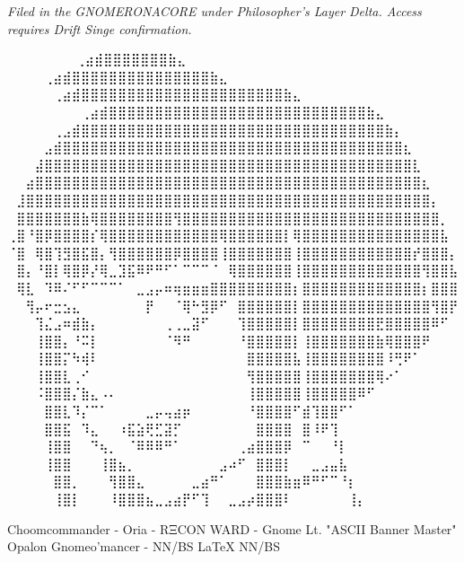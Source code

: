 \vspace{2em}
\begin{flushright}
\textit{Filed in the GNOMERONACORE under Philosopher’s Layer Delta. Access requires Drift Singe confirmation.}
\end{flushright}

\iffalse

  ⠀⠀⠀⠀⠀             ⠀⠀⢀⣴⣾⣿⣿⣿⣿⣿⣿⣿⣷⣄⠀⠀⠀⠀⠀⠀⠀⠀
⠀⠀⠀  ⠀      ⠀⠀⠀⠀⢀⣴⣾⣿⣿⣿⣿⣿⣿⣿⣿⣿⣿⣿⣿⣿⣿⣿⣷⣄⠀⠀⠀⠀⠀⠀⠀⠀
⠀⠀ ⠀   ⠀⠀⠀⠀⠀⢀⣴⣾⣿⣿⣿⣿⣿⣿⣿⣿⣿⣿⣿⣿⣿⣿⣿⣿⣿⣿⣿⣿⣿⣿⣷⣄⠀⠀⠀⠀⠀⠀⠀⠀
⠀⠀⠀⠀⠀⠀⠀⠀⢀⣴⣾⣿⣿⣿⣿⣿⣿⣿⣿⣿⣿⣿⣿⣿⣿⣿⣿⣿⣿⣿⣿⣿⣿⣿⣿⣿⣿⣿⣿⣷⣄⠀⠀⠀⠀⠀⠀⠀⠀
⠀⠀⠀⠀⠀⢀⣠⣾⣿⣿⣿⣿⣿⣿⣿⣿⣿⣿⣿⣿⣿⣿⣿⣿⣿⣿⣿⣿⣿⣿⣿⣿⣿⣿⣿⣿⣿⣿⣿⣿⣿⣷⡄⠀⠀⠀⠀⠀⠀
⠀⠀⠀⠀⣠⣾⣿⣿⣿⣿⣿⣿⣿⣿⣿⣿⣿⣿⣿⣿⣿⣿⣿⣿⣿⣿⣿⣿⣿⣿⣿⣿⣿⣿⣿⣿⣿⣿⣿⣿⣿⣿⣿⣆⠀⠀⠀⠀⠀
⠀⠀⠀⣼⣿⣿⣿⣿⣿⣿⣿⣿⣿⣿⣿⣿⣿⣿⣿⣿⣿⣿⣿⣿⣿⣿⣿⣿⣿⣿⣿⣿⣿⣿⣿⣿⣿⣿⣿⣿⣿⣿⣿⣿⣇⠀⠀⠀⠀
⠀⠀⣴⣿⣿⣿⣿⣿⣿⣿⣿⣿⣿⣿⣿⣿⣿⣿⣿⣿⣿⣿⣿⣿⣿⣿⣿⣿⣿⣿⣿⣿⣿⣿⣿⣿⣿⣿⣿⣿⣿⣿⣿⣿⣿⣆⠀⠀⠀
⠀⣸⣿⣿⣿⣿⣿⣿⣿⣿⣿⣿⣿⣿⣿⣿⣿⣿⣿⣿⣿⣿⣿⣿⣿⣿⣿⣿⣿⣿⣿⣿⣿⣿⣿⣿⣿⣿⣿⣿⣿⣿⣿⣿⣿⣿⡄⠀⠀
⠀⣿⣿⣿⣿⣿⣿⣿⣷⢿⣿⣿⣿⣿⣿⣿⣿⣿⢻⣿⣿⣿⣿⣿⣿⣿⣿⣿⣿⣿⣿⣿⣿⣿⣿⣿⣿⣿⣿⣿⣿⣿⣿⣿⣿⣿⣿⡀⠀
⢀⣿⠘⣿⡿⣿⣿⣿⣿⡎⢿⣿⣿⣿⣿⣿⣿⣿⣿⣿⣿⣿⣿⢿⣿⣿⣿⣿⣿⣿⡇⢿⣿⣿⣿⣿⣿⣿⣿⣿⣿⣿⣿⣿⣿⣿⣿⣧⠀
⠈⣿⠀⢿⣿⢹⣻⣿⣯⣿⡄⢻⣿⣿⣿⣿⣿⣿⡿⣿⣿⣿⣿⢸⣿⣿⣿⣿⣿⣿⣿⢸⣿⣿⣿⣿⣿⣿⣿⣿⣿⣿⣿⣿⡞⣿⣿⣿⡄
⠀⣿⡄⠘⣿⡇⢿⣿⡿⡜⢿⣀⣹⣯⠿⠟⠛⠋⠁⠉⠉⠉⠈⠀⢿⣿⣿⣿⣿⣿⣿⢸⣿⣿⣿⣿⣿⣿⣿⣿⣿⣿⣿⣿⣿⢻⣿⣿⣧
⠀⢿⣇⠀⠹⠿⠌⠋⠋⠉⠉⠉⠁⠀⣀⣠⡤⠶⢶⣶⣶⣶⣿⣿⣿⣿⣿⣿⣿⣿⣿⡆⣿⣿⣿⣿⣿⣿⣿⣿⣿⣿⣿⣿⣿⡆⣿⣿⣿
⠀⠀⢻⡤⠖⣒⣢⣄⠀⠀⠀⠀⠀⠀⠀⡟⠀⠀⠈⢿⠓⣻⡿⠋⠀⣿⣿⣿⣿⣿⣿⡇⣿⣿⣿⣿⣿⣿⣿⣿⣿⣿⣿⣿⣿⣿⢻⣿⡟
⠀⠀⠀⢹⣌⣠⠶⣾⣷⡄⠀⠀⠀⠀⠀⠀⠀⢀⢀⣀⣽⠋⠀⠀⠀⢹⣿⣿⣿⣿⣿⡇⣿⣿⣿⣿⣿⣿⣿⣿⣟⣿⣿⣿⣿⣿⠿⠋⠀
⠀⠀⠀⢸⣿⣿⡄⠘⠭⡇⠀⠀⠀⠀⠀⠀⠀⠈⠻⠛⠀⠀⠀⠀⠀⠘⣿⣿⣿⣿⣿⡇⢸⣿⣿⣿⣿⣿⣿⣿⣷⢿⣿⣿⣿⠟⠀⠀⠀
⠀⠀⠀⢸⣿⣿⡍⠳⢾⠇⠀⠀⠀⠀⠀⠀⠀⠀⠀⠀⠀⠀⠀⠀⠀⠀⣿⣿⣿⣿⣿⣧⢸⣿⣿⣿⣿⣿⣿⣿⣿⠸⢛⠟⠁⠀⠀⠀⠀
⠀⠀⠀⢸⣿⣿⣇⢀⠊⠀⠀⠀⠀⠀⠀⠀⠀⠀⠀⠀⠀⠀⠀⠀⠀⠀⢻⣿⣿⣿⣿⣿⢸⣿⣿⣿⣿⣿⣿⣿⢿⠔⠁⠀⠀⠀⠀⠀⠀
⠀⠀⠀⠨⣿⣿⣿⡌⣷⣄⠠⠄⠀⠀⠀⠀⠀⠀⠀⠀⠀⠀⠀⠀⠀⠀⢸⣿⣿⣿⣿⣿⢸⣿⣿⣿⣿⣿⠿⠋⠀⠀⠀⠀⠀⠀⠀⠀⠀
⠀⠀⠀⠀⣿⣿⣇⠹⡌⠉⠁⠀⠀⠀⠀⣀⡤⢤⣴⡶⠀⠀⠀⠀⠀⠀⠘⣿⣿⣿⣿⠋⣾⢹⣿⣿⠋⠁⠀⠀⠀⠀⠀⠀⠀⠀⠀⠀⠀
⠀⠀⠀⠀⣿⣿⣯⠀⠹⣄⠀⠀⠰⣯⣵⢟⣋⣽⡋⠀⠀⠀⠀⠀⠀⠀⠀⣿⣿⣿⣿⠀⣿⠸⠟⢹⠀⠀⠀⠀⠀⠀⠀⠀⠀⠀⠀⠀⠀
⠀⠀⠀⠀⢸⣿⣿⠀⠀⠙⢦⡀⠀⠈⠿⠿⠿⠛⠁⠀⠀⠀⠀⠀⠀⢀⣴⣿⣿⣿⡿⠀⠉⠀⠀⠘⡇⠀⠀⠀⠀⠀⠀⠀⠀⠀⠀⠀⠀
⠀⠀⠀⠀⢸⣿⣿⠀⠀⠀⢸⣿⣦⡀⠀⠀⠀⠀⠀⠀⠀⠀⠀⣠⠴⠋⠀⣿⣿⣿⡇⠀⠀⣀⣠⣤⣧⠀⠀⠀⠀⠀⠀⠀⠀⠀⠀⠀⠀
⠀⠀⠀⠀⠀⣿⣿⡀⠀⠀⠀⢻⣿⣿⣄⠀⠀⠀⠀⠀⣀⣴⠛⠁⠀⠀⠀⣿⣿⣿⣷⣶⠿⠛⠋⠉⠘⡆⠀⠀⠀⠀⠀⠀⠀⠀⠀⠀⠀
⠀⠀⠀⠀⠀⢸⣿⡇⠀⠀⠀⠸⣿⣿⣿⣦⣀⣠⣴⡟⠋⢹⠀⠀⣀⣠⡴⣿⣿⣿⠇⠀⠀⠀⠀⠀⠀⢸⡄⠀⠀⠀⠀⠀⠀⠀⠀⠀⠀

Choomcommander - Oria - RΞCON WARD - Gnome Lt. "ASCII Banner Master"
             Opalon Gnomeo'mancer - NN/BS LaTeX{} NN/BS

